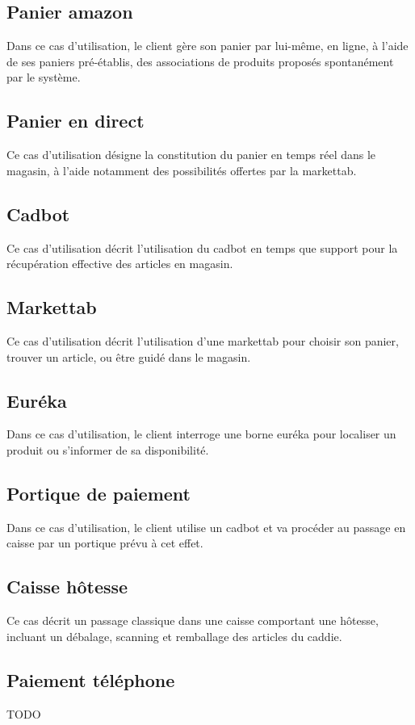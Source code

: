 \subsection{Panier amazon}
Dans ce cas d'utilisation, le client gère son panier par lui-même, en ligne, à l'aide de ses paniers pré-établis, des associations de produits proposés spontanément par le système.

\subsection{Panier en direct}
Ce cas d'utilisation désigne la constitution du panier en temps réel dans le magasin, à l'aide notamment des possibilités offertes par la markettab.

\subsection{Cadbot}
Ce cas d'utilisation décrit l'utilisation du cadbot en temps que support pour la récupération effective des articles en magasin.

\subsection{Markettab}
Ce cas d'utilisation décrit l'utilisation d'une markettab pour choisir son panier, trouver un article, ou être guidé dans le magasin.

\subsection{Euréka}
Dans ce cas d'utilisation, le client interroge une borne euréka pour localiser un produit ou s'informer de sa disponibilité.

\subsection{Portique de paiement}
Dans ce cas d'utilisation, le client utilise un cadbot et va procéder au passage en caisse par un portique prévu à cet effet. 

\subsection{Caisse hôtesse}
Ce cas décrit un passage classique dans une caisse comportant une hôtesse, incluant un débalage, scanning et remballage des articles du caddie.

\subsection{Paiement téléphone}
TODO

